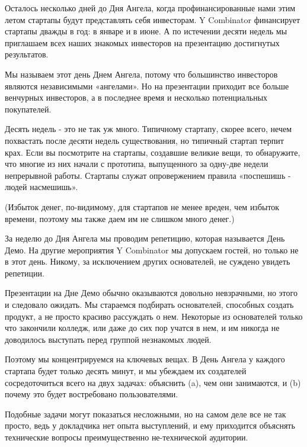 \documentclass[ebook,12pt,oneside,openany]{memoir}
\author{Пол Грэм} \date{}
\begin{document}
\maketitle

Осталось несколько дней до Дня Ангела, когда профинансированные нами
этим летом стартапы будут представлять себя инвесторам. Y Combinator
финансирует стартапы дважды в год: в январе и в июне. А по истечении
десяти недель мы приглашаем всех наших знакомых инвесторов на
презентацию достигнутых результатов.

Мы называем этот день Днем Ангела, потому что большинство инвесторов
являются независимыми «ангелами». Но на презентации приходит все
больше венчурных инвесторов, а в последнее время и несколько
потенциальных покупателей.

Десять недель - это не так уж много. Типичному стартапу, скорее всего,
нечем похвастать после десяти недель существования, но типичный
стартап терпит крах. Если вы посмотрите на стартапы, создавшие великие
вещи, то обнаружите, что многие из них начали с прототипа, выпущенного
за одну-две недели непрерывной работы. Стартапы служат опровержением
правила «поспешишь - людей насмешишь».

(Избыток денег, по-видимому, для стартапов не менее вреден, чем
избыток времени, поэтому мы также даем им не слишком много денег.)

За неделю до Дня Ангела мы проводим репетицию, которая называется День
Демо. На другие мероприятия Y Combinator мы допускаем гостей, но
только не в этот день. Никому, за исключением других основателей, не
суждено увидеть репетиции.

Презентации на Дне Демо обычно оказываются довольно невзрачными, но
этого и следовало ожидать. Мы стараемся подбирать основателей,
способных создать продукт, а не просто красиво рассуждать о нем.
Некоторые из основателей только что закончили колледж, или даже до сих
пор учатся в нем, и им никогда не доводилось выступать перед группой
незнакомых людей.

Поэтому мы концентрируемся на ключевых вещах. В День Ангела у каждого
стартапа будет только десять минут, и мы убеждаем их создателей
сосредоточиться всего на двух задачах: объяснить (a), чем они
занимаются, и (b) почему это будет востребовано пользователями.

Подобные задачи могут показаться несложными, но на самом деле все не
так просто, ведь у докладчика нет опыта выступлений, и ему приходится
объяснять технические вопросы преимущественно не-технической
аудитории.
\end{document}
